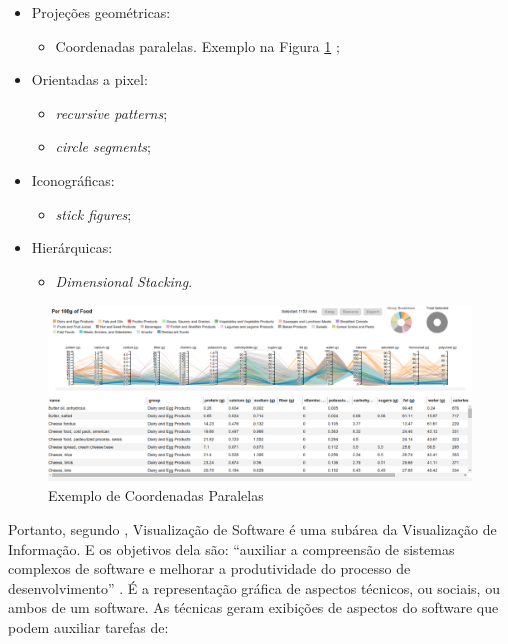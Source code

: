 \begin{itemize}
  \item Projeções geométricas:
	\begin{itemize}
		\item Coordenadas paralelas. Exemplo na Figura \ref{fig:parallel} \cite{kaichang2015};
	\end{itemize}
  \item Orientadas a pixel:
	\begin{itemize}
		\item \textit{recursive patterns};
		\item \textit{circle segments};
	\end{itemize}
  \item Iconográficas:
	\begin{itemize}
		\item \textit{stick figures};
	\end{itemize}
  \item Hierárquicas:
	\begin{itemize}
		\item \textit{Dimensional Stacking}.
	\end{itemize}
\end{itemize}

\begin{figure}[!htb]
  \centering
    \includegraphics[keepaspectratio=true,scale=0.3]
    {figuras/parallel.eps}
  \caption{Exemplo de Coordenadas Paralelas}
  \label{fig:parallel}
\end{figure}

Portanto, segundo , Visualização de Software
é uma subárea da Visualização de Informação. E os objetivos dela são: ``auxiliar
a compreensão de sistemas complexos de software e melhorar a produtividade do
processo de desenvolvimento'' \cite{messias2012}. É a representação gráfica de
aspectos técnicos, ou sociais, ou ambos de um software. As técnicas geram
exibições de aspectos do software que podem auxiliar tarefas de:

